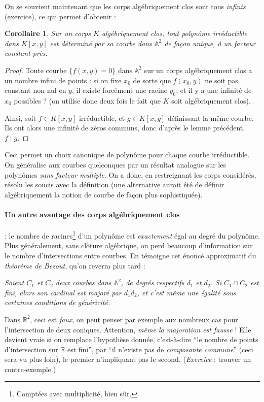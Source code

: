 \documentclass[a4paper, 11pt]{article}
\newtheorem{corollaire}[théorème]{Corollaire}
\theoremstyle{definition}
\newcommand{\real}{\mathbb{R}}
\newcommand{\aff}{\mathbb{A}}
\begin{document}
On se souvient maintenant que les corps algébriquement clos sont tous
\emph{infinis} (exercice), ce qui permet d'obtenir :
\begin{corollaire}
  Sur un corps $K$ algébriquement clos, tout polynôme
  \emph{irréductible} dans $K[x,y]$ est déterminé par sa courbe dans
  $\aff^2$ de façon unique, à un facteur constant près.
\end{corollaire}
\begin{proof}
  Toute courbe $\{f(x,y)=0\}$ dans $\aff^2$ sur un corps
  algébriquement clos a un nombre infini de points : si on fixe $x_0$
  de sorte que $f(x_0,y)$ ne soit pas constant non nul en $y$, il
  existe forcément une racine $y_0$, et il y a une infinité de $x_0$
  possibles ? (on utilise donc deux fois le fait que $K$ soit
  algébriquement clos).

  Ainsi, soit $f \in K[x,y]$ irréductible, et $g \in K[x,y]$
  définissant la même courbe. Ils ont alors une infinité de zéros
  communs, donc d'après le lemme précédent, $f \mid g$.
\end{proof}

Ceci permet un choix canonique de polynôme pour chaque courbe
irréductible. On généralise aux courbes quelconques par un résultat
analogue sur les polynômes \emph{sans facteur multiple}. On a donc, en
restreignant les corps considérés, résolu les soucis avec la
définition (une alternative aurait été de définir algébriquement la
notion de courbe de façon plus sophistiquée).

\paragraph{Un autre avantage des corps algébriquement clos} : le nombre de
racines\footnote{Comptées avec multiplicité, bien sûr.} d'un polynôme
est \emph{exactement} égal au degré du polynôme. Plus généralement,
sans clôture algébrique, on perd beaucoup d'information sur le nombre
d'intersections entre courbes. En témoigne cet énoncé approximatif du
\emph{théorème de Bezout}, qu'on reverra plus tard :

\textit{Soient $C_1$ et $C_2$ deux courbes dans $\aff^2$, de degrés
  respectifs $d_1$ et $d_2$. Si $C_1 \cap C_2$ est fini, alors son
  cardinal est majoré par $d_1 d_2$, et c'est même une égalité sous
  certaines conditions de généricité.}

Dans $\real^2$, ceci est \emph{faux}, on peut penser par exemple aux
nombreux cas pour l'intersection de deux coniques. Attention,
\emph{même la majoration est fausse} ! Elle devient vraie si on
remplace l'hypothèse donnée, c'est-à-dire \enquote{le nombre de points
  d'intersection sur $\real$ est fini}, par \enquote{il n'existe pas
  de \emph{composante commune}} (ceci sera vu plus loin), le premier
n'impliquant pas le second. (\textit{Exercice} : trouver un contre-exemple.)
\end{document}
